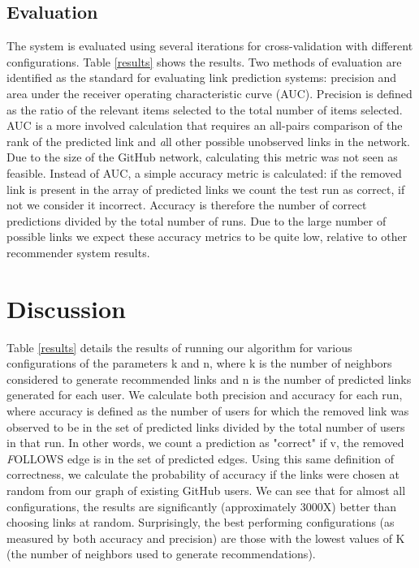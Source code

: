 \subsection{Evaluation}
The system is evaluated using several iterations for cross-validation with different configurations. Table \ref{results} shows the results. Two methods of evaluation are identified as the standard for evaluating link prediction systems: precision and area under the receiver operating characteristic curve (AUC). Precision is defined as the ratio of the relevant items selected to the total number of items selected. AUC is a more involved calculation that requires an all-pairs comparison of the rank of the predicted link and {\textit all other possible unobserved links in the network}. Due to the size of the GitHub network, calculating this metric was not seen as feasible. Instead of AUC, a simple accuracy metric is calculated: if the removed link is present in the array of predicted links we count the test run as correct, if not we consider it incorrect. Accuracy is therefore the number of correct predictions divided by the total number of runs. Due to the large number of possible links we expect these accuracy metrics to be quite low, relative to other recommender system results. 

\section{Discussion}
Table \ref{results} details the results of running our algorithm for various configurations of the parameters k and n, where k is the number of neighbors considered to generate recommended links and n is the number of predicted links generated for each user. We calculate both precision and accuracy for each run, where accuracy is defined as the number of users for which the removed link was observed to be in the set of predicted links divided by the total number of users in that run. In other words, we count a prediction as "correct" if v, the removed {\textit FOLLOWS} edge is in the set of predicted edges. Using this same definition of correctness, we calculate the probability of accuracy if the links were chosen at random from our graph of existing GitHub users. We can see that for almost all configurations, the results are significantly (approximately 3000X) better than choosing links at random. Surprisingly, the best performing configurations (as measured by both accuracy and precision) are those with the lowest values of K (the number of neighbors used to generate recommendations).


